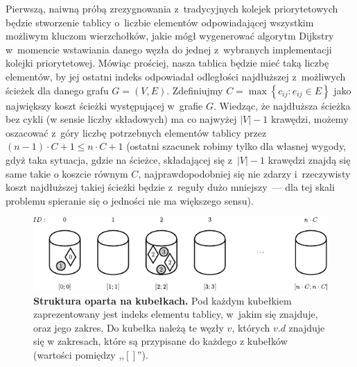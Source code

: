 Pierwszą, naiwną próbą zrezygnowania z~tradycyjnych kolejek priorytetowych będzie stworzenie tablicy o~liczbie elementów odpowiadającej wszystkim możliwym kluczom wierzchołków, jakie mógł wygenerować algorytm Dijkstry w~momencie wstawiania danego węzła do jednej z~wybranych implementacji kolejki priorytetowej.
Mówiąc prościej, nasza tablica będzie mieć taką liczbę elementów, by jej ostatni indeks odpowiadał odległości najdłuższej z~możliwych ścieżek dla danego grafu $G = \left( V, E \right)$.
Zdefiniujmy $C = \max \left\{ c_{ij} : e_{ij} \in E \right\}$ jako największy koszt ścieżki występującej w~grafie $G$.
Wiedząc, że najdłuższa ścieżka bez cykli (w sensie liczby składowych) ma co najwyżej $\left| V \right| - 1$ krawędzi, możemy oszacować z~góry liczbę potrzebnych elementów tablicy przez $\left( n - 1 \right) \cdot C + 1 \leqslant n \cdot C + 1$ (ostatni szacunek robimy tylko dla własnej wygody, gdyż taka sytuacja, gdzie na ścieżce, składającej się z~$ \left| V \right| - 1$ krawędzi znajdą się same takie o koszcie równym $C$, najprawdopodobniej się nie zdarzy i~rzeczywisty koszt najdłuższej takiej ścieżki będzie z~reguły dużo mniejszy~--- dla tej skali problemu spieranie się o jedności nie ma większego sensu).

\begin{figure}[!htbp]
	\centering
	\null\hfill
	\includegraphics[width=\textwidth]{Chapter_II/SIMPLE-BUCKET-Example/a.pdf}
	\hfill\null
	\caption{
		\textbf{Struktura oparta na kubełkach.}
		Pod każdym kubełkiem zaprezentowany jest indeks elementu tablicy, w~jakim się znajduje, oraz jego zakres.
		Do kubełka należą te węzły $v$, których $v.d$ znajduje się w zakresach, które są przypisane do każdego z kubełków (wartości pomiędzy ,,$ \left[ \right]$'').
	}
	\label{fig:exampleSimpleBucket}
\end{figure}

